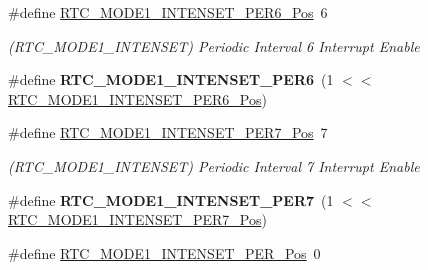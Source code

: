 \begin{DoxyCompactItemize}
\item 
\hypertarget{group___s_a_m_l21___r_t_c_gad29cd9b2a6144f5d2dce21144bc11ace}{}\#define \hyperlink{group___s_a_m_l21___r_t_c_gad29cd9b2a6144f5d2dce21144bc11ace}{R\+T\+C\+\_\+\+M\+O\+D\+E1\+\_\+\+I\+N\+T\+E\+N\+S\+E\+T\+\_\+\+P\+E\+R6\+\_\+\+Pos}~6\label{group___s_a_m_l21___r_t_c_gad29cd9b2a6144f5d2dce21144bc11ace}

\begin{DoxyCompactList}\small\item\em (R\+T\+C\+\_\+\+M\+O\+D\+E1\+\_\+\+I\+N\+T\+E\+N\+S\+E\+T) Periodic Interval 6 Interrupt Enable \end{DoxyCompactList}\item 
\hypertarget{group___s_a_m_l21___r_t_c_ga29d3b431a3529a962e5ff3549976135d}{}\#define {\bfseries R\+T\+C\+\_\+\+M\+O\+D\+E1\+\_\+\+I\+N\+T\+E\+N\+S\+E\+T\+\_\+\+P\+E\+R6}~(1 $<$$<$ \hyperlink{group___s_a_m_l21___r_t_c_gad29cd9b2a6144f5d2dce21144bc11ace}{R\+T\+C\+\_\+\+M\+O\+D\+E1\+\_\+\+I\+N\+T\+E\+N\+S\+E\+T\+\_\+\+P\+E\+R6\+\_\+\+Pos})\label{group___s_a_m_l21___r_t_c_ga29d3b431a3529a962e5ff3549976135d}

\item 
\hypertarget{group___s_a_m_l21___r_t_c_ga43ec42a60bc1c0a97218f5f814b29ceb}{}\#define \hyperlink{group___s_a_m_l21___r_t_c_ga43ec42a60bc1c0a97218f5f814b29ceb}{R\+T\+C\+\_\+\+M\+O\+D\+E1\+\_\+\+I\+N\+T\+E\+N\+S\+E\+T\+\_\+\+P\+E\+R7\+\_\+\+Pos}~7\label{group___s_a_m_l21___r_t_c_ga43ec42a60bc1c0a97218f5f814b29ceb}

\begin{DoxyCompactList}\small\item\em (R\+T\+C\+\_\+\+M\+O\+D\+E1\+\_\+\+I\+N\+T\+E\+N\+S\+E\+T) Periodic Interval 7 Interrupt Enable \end{DoxyCompactList}\item 
\hypertarget{group___s_a_m_l21___r_t_c_ga24492e11a03fbc37dfb890376ee85010}{}\#define {\bfseries R\+T\+C\+\_\+\+M\+O\+D\+E1\+\_\+\+I\+N\+T\+E\+N\+S\+E\+T\+\_\+\+P\+E\+R7}~(1 $<$$<$ \hyperlink{group___s_a_m_l21___r_t_c_ga43ec42a60bc1c0a97218f5f814b29ceb}{R\+T\+C\+\_\+\+M\+O\+D\+E1\+\_\+\+I\+N\+T\+E\+N\+S\+E\+T\+\_\+\+P\+E\+R7\+\_\+\+Pos})\label{group___s_a_m_l21___r_t_c_ga24492e11a03fbc37dfb890376ee85010}

\item 
\hypertarget{group___s_a_m_l21___r_t_c_gadc85bf7bba06261945c6e162c43018e0}{}\#define \hyperlink{group___s_a_m_l21___r_t_c_gadc85bf7bba06261945c6e162c43018e0}{R\+T\+C\+\_\+\+M\+O\+D\+E1\+\_\+\+I\+N\+T\+E\+N\+S\+E\+T\+\_\+\+P\+E\+R\+\_\+\+Pos}~0\label{group___s_a_m_l21___r_t_c_gadc85bf7bba06261945c6e162c43018e0}


\end{DoxyCompactItemize}
